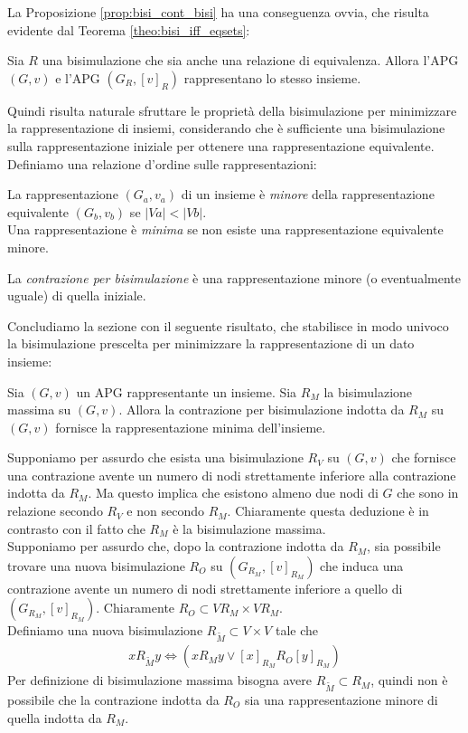 La Proposizione \ref{prop:bisi_cont_bisi} ha una conseguenza ovvia, che risulta evidente dal Teorema \ref{theo:bisi_iff_eqsets}:
\begin{corollary}
    Sia $R$ una bisimulazione che sia anche una relazione di equivalenza. Allora l'APG $(G, v)$ e l'APG $(G_R, [v]_R)$ rappresentano lo stesso insieme.
\end{corollary}
Quindi risulta naturale sfruttare le proprietà della bisimulazione per minimizzare la rappresentazione di insiemi, considerando che è sufficiente una bisimulazione sulla rappresentazione iniziale per ottenere una rappresentazione equivalente. Definiamo una relazione d'ordine sulle rappresentazioni:
\begin{definition}
    La rappresentazione $(G_a, v_a)$ di un insieme è \emph{minore} della rappresentazione equivalente $(G_b, v_b)$ se $|Va| < |Vb|$.\\
    Una rappresentazione è \emph{minima} se non esiste una rappresentazione equivalente minore.
\end{definition}
\begin{observation}
    La \emph{contrazione per bisimulazione} è una rappresentazione minore (o eventualmente uguale) di quella iniziale.
\end{observation}
Concludiamo la sezione con il seguente risultato, che stabilisce in modo univoco la bisimulazione prescelta per minimizzare la rappresentazione di un dato insieme:
\begin{theorem}
    Sia $(G,v)$ un APG rappresentante un insieme. Sia $R_M$ la bisimulazione massima su $(G,v)$. Allora la contrazione per bisimulazione indotta da $R_M$ su $(G,v)$ fornisce la rappresentazione minima dell'insieme.
\end{theorem}
\begin{proof2}
    Supponiamo per assurdo che esista una bisimulazione $R_V$ su $(G,v)$ che fornisce una contrazione avente un numero di nodi strettamente inferiore alla contrazione indotta da $R_M$. Ma questo implica che esistono almeno due nodi di $G$ che sono in relazione secondo $R_V$ e non secondo $R_M$. Chiaramente questa deduzione è in contrasto con il fatto che $R_M$ è la bisimulazione massima.\\
    Supponiamo per assurdo che, dopo la contrazione indotta da $R_M$, sia possibile trovare una nuova bisimulazione $R_O$ su $(G_{R_M}, [v]_{R_M})$ che induca una contrazione avente un numero di nodi strettamente inferiore a quello di $(G_{R_M}, [v]_{R_M})$. Chiaramente $R_O \subset V{R_M} \times V{R_M}$.\\
    Definiamo una nuova bisimulazione $R_{\widetilde{M}} \subset V\times V$ tale che
    \begin{gather*}
        x R_{\widetilde{M}} y \iff (x R_M y \lor [x]_{R_M} R_O [y]_{R_M})
    \end{gather*}
    Per definizione di bisimulazione massima bisogna avere $R_{\widetilde{M}} \subset R_M$, quindi non è possibile che la contrazione indotta da $R_O$ sia una rappresentazione minore di quella indotta da $R_M$.
\end{proof2}

